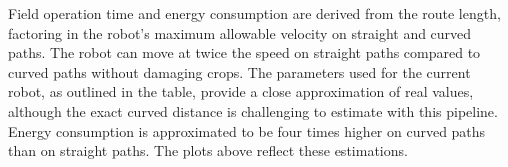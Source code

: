Field operation time and energy consumption are derived from the route length, factoring in the robot's maximum allowable velocity on straight and curved paths. The robot can move at twice the speed on straight paths compared to curved paths without damaging crops. The parameters used for the current robot, as outlined in the table, provide a close approximation of real values, although the exact curved distance is challenging to estimate with this pipeline. Energy consumption is approximated to be four times higher on curved paths than on straight paths. The plots above reflect these estimations. 















